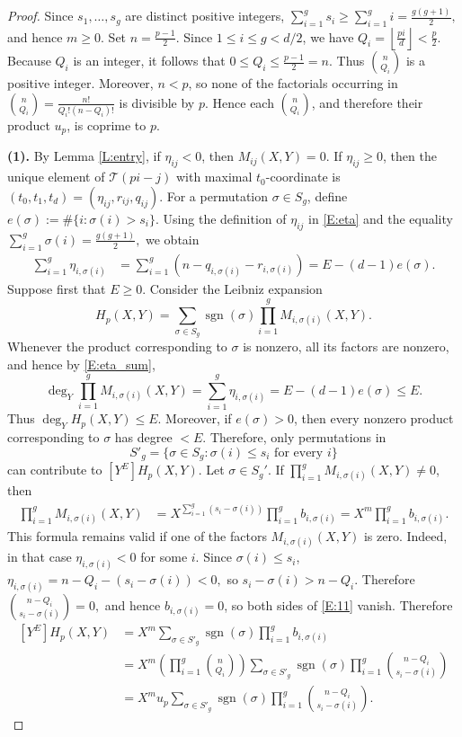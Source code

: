\documentclass[10pt,a4paper]{amsart}
\DeclareMathOperator{\sgn}{sgn}
\newcommand{\cT}{\mathcal{T}}
\begin{document}
\begin{proof}
Since $s_1,\ldots,s_g$ are distinct positive integers, 
$
\sum_{i=1}^{g}s_i\geq \sum_{i=1}^{g}i=\frac{g(g+1)}2,
$
and hence $m\geq0$.
Set
$
n=\frac{p-1}{2}.
$
Since $1\leq i\leq g<d/2$, we have
$
Q_i=\left\lfloor\frac{pi}{d}\right\rfloor<\frac p2.
$
Because $Q_i$ is an integer, it follows that
$
0\leq Q_i\leq \frac{p-1}{2}=n.
$
Thus $\binom{n}{Q_i}$ is a positive integer. Moreover, $n<p$, so none of the factorials occurring in
$
\binom{n}{Q_i}=\frac{n!}{Q_i!(n-Q_i)!}
$
is divisible by $p$. Hence each 
$\binom{n}{Q_i}$, and therefore their product $u_p$, is coprime to $p$.

\noindent
{\bf(1).} 
By Lemma \ref{L:entry}, if $\eta_{ij}<0$, then  $M_{ij}(X,Y)=0$.
If $\eta_{ij}\ge 0$, then the unique element of $\cT(pi-j)$ with maximal
$t_0$-coordinate is 
$(t_0,t_1,t_d)=(\eta_{ij},r_{ij},q_{ij})$.
For a permutation $\sigma\in S_g$, define
$
e(\sigma):=\#\{i:\sigma(i)>s_i\}.
$
Using the definition of $\eta_{ij}$ in \eqref{E:eta} and the equality
$
\sum_{i=1}^{g}\sigma(i)=\frac{g(g+1)}2,
$
we obtain
\begin{align}\label{E:eta_sum}
\sum_{i=1}^{g}\eta_{i,\sigma(i)}
&=
\sum_{i=1}^{g}
\left(
n-q_{i,\sigma(i)}-r_{i,\sigma(i)}\right)=
E-(d-1)e(\sigma).
\end{align}
Suppose first that $E\ge 0$. Consider the Leibniz expansion
$$
H_p(X,Y)=\sum_{\sigma\in S_g}\sgn(\sigma)\prod_{i=1}^g M_{i,\sigma(i)}(X,Y).
$$
Whenever the product corresponding to $\sigma$ is nonzero, all its
factors are nonzero, and hence by \eqref{E:eta_sum},
$$
\deg_Y\prod_{i=1}^g M_{i,\sigma(i)}(X,Y)=
\sum_{i=1}^{g}\eta_{i,\sigma(i)}
=E-(d-1)e(\sigma)\leq E.
$$
Thus $\deg_YH_p(X,Y)\le E$.
Moreover, if $e(\sigma)>0$, then every nonzero product corresponding to $\sigma$ has degree $<E$. Therefore, only permutations in 
$$
S'_g=\{\sigma\in S_g: \sigma(i)\leq s_i\text{ for every $i$}\}
$$
can contribute to $[Y^E]H_p(X,Y)$.
Let $\sigma\in S_g'$. 
If $\prod_{i=1}^g M_{i,\sigma(i)}(X,Y)\ne 0$, 
then 
\begin{align}
[Y^E]\prod_{i=1}^{g} M_{i,\sigma(i)}(X,Y)
&=X^{\sum_{i=1}^g (s_i-\sigma(i))} \prod_{i=1}^gb_{i,\sigma(i)}
=X^m \prod_{i=1}^g b_{i,\sigma(i)}.
\label{E:11}
\end{align}
This formula remains valid if one of the factors 
$M_{i,\sigma(i)}(X,Y)
$
is zero. Indeed, in that case $\eta_{i,\sigma(i)}<0$ for some $i$.
Since $\sigma(i)\le s_i$,
$
\eta_{i,\sigma(i)}=n-Q_i-(s_i-\sigma(i))<0,
$
so
$
s_i-\sigma(i)>n-Q_i.
$
Therefore
$
\binom{n-Q_i}{s_i-\sigma(i)}=0,
$
and hence $b_{i,\sigma(i)}=0$, 
so both sides of \eqref{E:11} vanish.
Therefore
\begin{align}\label{E:12}
[Y^E]H_p(X,Y)
&=X^m\sum_{\sigma\in S'_g}\sgn(\sigma)\prod_{i=1}^{g}b_{i,\sigma(i)}
\\
&=X^m\left(
\prod_{i=1}^{g}\binom{n}{Q_i}
\right)
\sum_{\sigma\in S'_g}
\sgn(\sigma)
\prod_{i=1}^{g}
\binom{n-Q_i}{s_i-\sigma(i)} \nonumber\\
&=X^m u_p \sum_{\sigma\in S'_g}\sgn(\sigma)\prod_{i=1}^{g}
\binom{n-Q_i}{s_i-\sigma(i)}. \nonumber
\end{align}


\end{proof}
\end{document}
